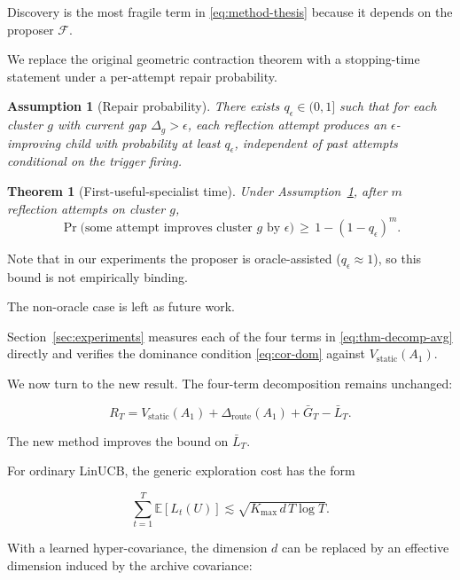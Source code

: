 \documentclass{article} %
\newtheorem{theorem}{Theorem}
\newtheorem{assumption}{Assumption}
\providecommand{\Rstatic}{V_{\mathrm{static}}}
\providecommand{\Droute}{\Delta_{\mathrm{route}}}
\providecommand{\Kmax}{K_{\max}}
\begin{document}
\label{sec:method-specialist}

Discovery is the most fragile term in \eqref{eq:method-thesis} because it depends on the proposer $\mathcal{F}$.

We replace the original geometric contraction theorem with a stopping-time statement under a per-attempt repair probability.

\begin{assumption}[Repair probability]
\label{ass:repair}
There exists $q_\epsilon \in (0,1]$ such that for each cluster $g$ with current gap $\Delta_g > \epsilon$, each reflection attempt produces an $\epsilon$-improving child with probability at least $q_\epsilon$, independent of past attempts conditional on the trigger firing.
\end{assumption}

\begin{theorem}[First-useful-specialist time]
\label{thm:specialist}
Under Assumption~\ref{ass:repair}, after $m$ reflection attempts on cluster $g$,
\begin{equation}
\label{eq:thm-specialist}
\Pr\bigl(\text{some attempt improves cluster } g \text{ by } \epsilon\bigr) \,\ge\, 1 - (1 - q_\epsilon)^m.
\end{equation}
\end{theorem}

Note that in our experiments the proposer is oracle-assisted ($q_\epsilon \approx 1$), so this bound is not empirically binding.

The non-oracle case is left as future work.

Section~\ref{sec:experiments} measures each of the four terms in \eqref{eq:thm-decomp-avg} directly and verifies the dominance condition \eqref{eq:cor-dom} against $V_{\mathrm{static}}(A_1)$.

\label{sec:theory}

We now turn to the new result. The four-term decomposition remains unchanged:

\[
R_T = \Rstatic(A_1) + \Droute(A_1) + \bar{G}_T - \bar{L}_T .
\]

The new method improves the bound on $\bar{L}_T$.

For ordinary LinUCB, the generic exploration cost has the form

\[
\sum_{t=1}^{T} \mathbb{E}[L_t(U)] \lesssim \sqrt{ \Kmax\, d\, T \log T }.
\]

With a learned hyper-covariance, the dimension $d$ can be replaced by an
effective dimension induced by the archive covariance:
\end{document}
